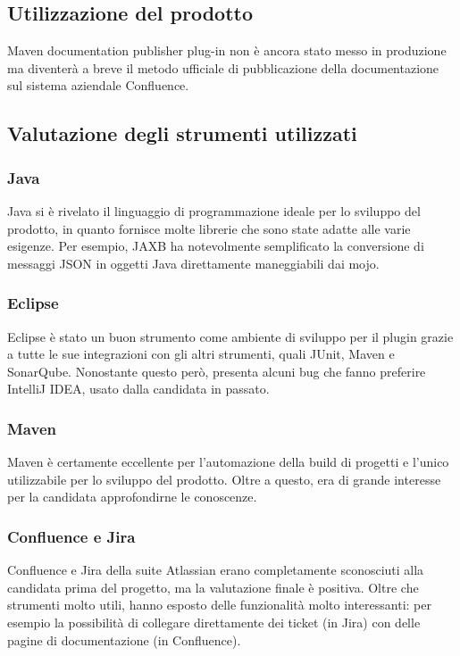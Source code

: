 \subsection{Utilizzazione del prodotto} %
Maven documentation publisher plug-in non è ancora stato messo in produzione ma diventerà a breve il metodo ufficiale di pubblicazione della documentazione sul sistema aziendale Confluence.


\subsection{Valutazione degli strumenti utilizzati}

    \subsubsection{Java}
    Java si è rivelato il linguaggio di programmazione ideale per lo sviluppo del prodotto, in quanto fornisce molte librerie che sono state adatte alle varie esigenze.
    Per esempio, JAXB ha notevolmente semplificato la conversione di messaggi JSON in oggetti Java direttamente maneggiabili dai mojo.

    \subsubsection{Eclipse}
    Eclipse è stato un buon strumento come ambiente di sviluppo per il plugin grazie a tutte le sue integrazioni con gli altri strumenti, quali JUnit, Maven e SonarQube.
    Nonostante questo però, presenta alcuni bug che fanno preferire IntelliJ IDEA, usato dalla candidata in passato.

    \subsubsection{Maven}
    Maven è certamente eccellente per l'automazione della build di progetti e l'unico utilizzabile per lo sviluppo del prodotto.
    Oltre a questo, era di grande interesse per la candidata approfondirne le conoscenze.

    \subsubsection{Confluence e Jira}
    Confluence e Jira della suite Atlassian erano completamente sconosciuti alla candidata prima del progetto, ma la valutazione finale è positiva.
    Oltre che strumenti molto utili, hanno esposto delle funzionalità molto interessanti: per esempio la possibilità di collegare direttamente dei ticket (in Jira) con delle pagine di documentazione (in Confluence).

